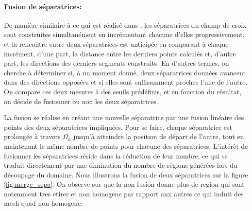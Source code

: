 \paragraph{Fusion de séparatrices:} 
De manière similaire à ce qui est réalisé dans \cite{marcon2019high}, les séparatrices du champ de croix sont construites simultanément en incrémentant chacune d'elles progressivement, et la rencontre entre deux séparatrices est anticipée en comparant à chaque incrément, d'une part, la distance entre les derniers points calculés et, d'autre part, les directions des derniers segments construits. En d'autres termes, on cherche à déterminer si, à un moment donné, deux séparatrices données avancent dans des directions opposées et si elles sont suffisamment proches l'une de l'autre. On compare ces deux mesures à des seuils prédéfinis, et en fonction du résultat, on décide de fusionner ou non les deux séparatrices.

La fusion se réalise en créant une nouvelle séparatrice par une fusion linéaire des points des deux séparatrices impliquées. Pour se faire, chaque séparatrice est prolongée à travers $\Omega_h$ jusqu'à atteindre la position de départ de l'autre, tout en maintenant le même nombre de points pour chacune des séparatrices. L'intérêt de fusionner les séparatrices réside dans la réduction de leur nombre, ce qui se traduit directement par une diminution du nombre de régions générées lors du découpage du domaine. Nous illustrons la fusion de deux séparatrices sur la figure \ref{fig:merge_sepa}. On observe sur que la non fusion donne plus de region qui sont notemment tres etirer et non homogene par rapport aux autres ce qui induit des mesh quad non homogene.

